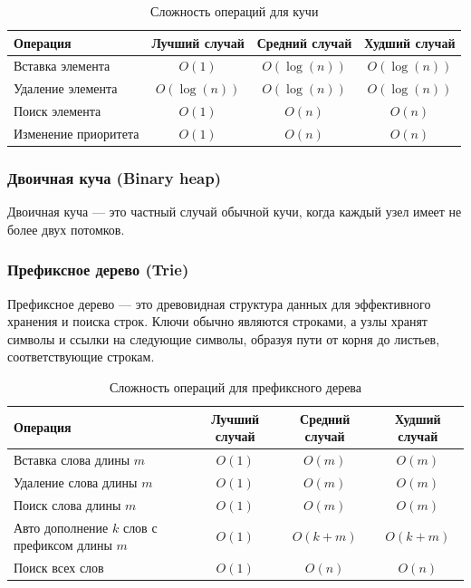 \documentclass[a4paper,12pt]{article}
\begin{document}
\begin{table}[H]
    \centering
    \begin{tabular}{|l|c|c|c|}
        \hline
        Операция & Лучший случай & Средний случай & Худший случай \\
        \hline
        Вставка элемента & $O(1)$ & $O(\log(n))$ & $O(\log(n))$ \\
        \hline
        Удаление элемента & $O(\log(n))$ & $O(\log(n))$ & $O(\log(n))$ \\
        \hline
        Поиск элемента & $O(1)$ & $O(n)$ & $O(n)$ \\
        \hline
        Изменение приоритета & $O(1)$ & $O(n)$ & $O(n)$ \\
        \hline
    \end{tabular}
    \caption{Сложность операций для кучи}
\end{table}

\subsubsection{Двоичная куча (Binary heap)}
\label{subsubsec:двоичная-куча-binary-heap}

Двоичная куча --- это частный случай обычной кучи, когда каждый узел имеет не более двух потомков.

\subsubsection{Префиксное дерево (Trie)}
\label{subsubsec:префиксное-дерево-trie}

Префиксное дерево --- это древовидная структура данных для эффективного хранения и поиска строк. Ключи обычно являются строками, а узлы хранят символы и ссылки на следующие символы, образуя пути от корня до листьев, соответствующие строкам.

\begin{table}[H]
    \centering
    \begin{tabular}{|l|c|c|c|}
        \hline
        Операция & Лучший случай & Средний случай & Худший случай \\
        \hline
        Вставка слова длины $m$ & $O(1)$ & $O(m)$ & $O(m)$ \\
        \hline
        Удаление слова длины $m$ & $O(1)$ & $O(m)$ & $O(m)$ \\
        \hline
        Поиск слова длины $m$ & $O(1)$ & $O(m)$ & $O(m)$ \\
        \hline
        \makecell[l]{Авто дополнение $k$ слов \\с префиксом длины $m$} & $O(1)$ & $O(k + m)$ & $O(k + m)$ \\
        \hline
        Поиск всех слов & $O(1)$ & $O(n)$ & $O(n)$ \\
        \hline
    \end{tabular}
    \caption{Сложность операций для префиксного дерева}
\end{table}
\end{document}
